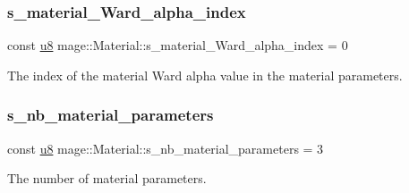 \subsubsection{\texorpdfstring{s\+\_\+material\+\_\+\+Ward\+\_\+alpha\+\_\+index}{s\_material\_Ward\_alpha\_index}}
{\footnotesize\ttfamily const \hyperlink{namespacemage_a5a362e2d56fc439362a80516ecae7828}{u8} mage\+::\+Material\+::s\+\_\+material\+\_\+\+Ward\+\_\+alpha\+\_\+index = 0\hspace{0.3cm}{\ttfamily [static]}}

The index of the material Ward alpha value in the material parameters. \hypertarget{structmage_1_1_material_a06d6d7b7243ea8acce9445b501816d78}{}\label{structmage_1_1_material_a06d6d7b7243ea8acce9445b501816d78} 
\subsubsection{\texorpdfstring{s\+\_\+nb\+\_\+material\+\_\+parameters}{s\_nb\_material\_parameters}}
{\footnotesize\ttfamily const \hyperlink{namespacemage_a5a362e2d56fc439362a80516ecae7828}{u8} mage\+::\+Material\+::s\+\_\+nb\+\_\+material\+\_\+parameters = 3\hspace{0.3cm}{\ttfamily [static]}}

The number of material parameters. 